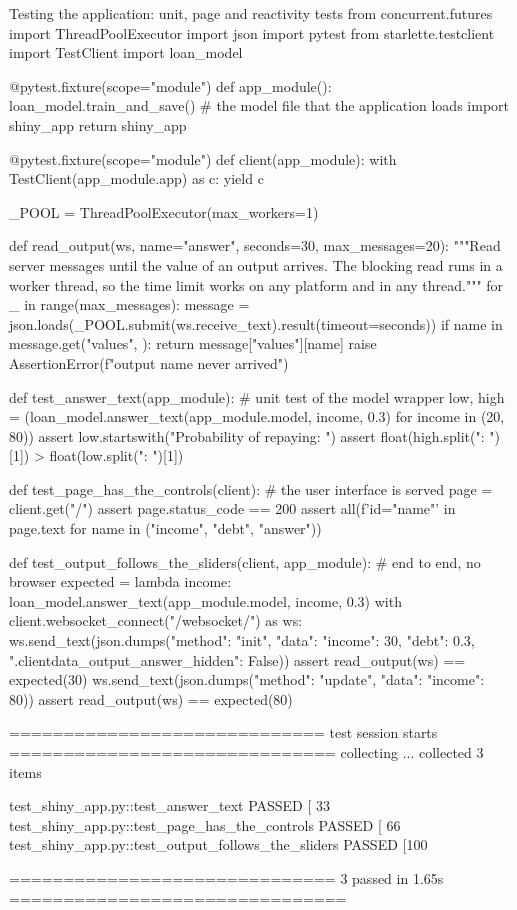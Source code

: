 \begin{pylisting}[label={lst:shinytest}]{Testing the application: unit, page and reactivity tests}
from concurrent.futures import ThreadPoolExecutor
import json
import pytest
from starlette.testclient import TestClient
import loan_model

@pytest.fixture(scope="module")
def app_module():
    loan_model.train_and_save()            # the model file that the application loads
    import shiny_app
    return shiny_app

@pytest.fixture(scope="module")
def client(app_module):
    with TestClient(app_module.app) as c:
        yield c

_POOL = ThreadPoolExecutor(max_workers=1)

def read_output(ws, name="answer", seconds=30, max_messages=20):
    """Read server messages until the value of an output arrives. The blocking read runs
    in a worker thread, so the time limit works on any platform and in any thread."""
    for _ in range(max_messages):
        message = json.loads(_POOL.submit(ws.receive_text).result(timeout=seconds))
        if name in message.get("values", {}):
            return message["values"][name]
    raise AssertionError(f"output {name} never arrived")


def test_answer_text(app_module):                    # unit test of the model wrapper
    low, high = (loan_model.answer_text(app_module.model, income, 0.3)
                 for income in (20, 80))
    assert low.startswith("Probability of repaying: ")
    assert float(high.split(": ")[1]) > float(low.split(": ")[1])

def test_page_has_the_controls(client):              # the user interface is served
    page = client.get("/")
    assert page.status_code == 200
    assert all(f'id="{name}"' in page.text for name in ("income", "debt", "answer"))

def test_output_follows_the_sliders(client, app_module):   # end to end, no browser
    expected = lambda income: loan_model.answer_text(app_module.model, income, 0.3)
    with client.websocket_connect("/websocket/") as ws:
        ws.send_text(json.dumps({"method": "init", "data": {
            "income": 30, "debt": 0.3, ".clientdata_output_answer_hidden": False}}))
        assert read_output(ws) == expected(30)
        ws.send_text(json.dumps({"method": "update", "data": {"income": 80}}))
        assert read_output(ws) == expected(80)
\end{pylisting}
\begin{pyoutput}
============================= test session starts ==============================
collecting ... collected 3 items

test_shiny_app.py::test_answer_text PASSED                               [ 33%
test_shiny_app.py::test_page_has_the_controls PASSED                     [ 66%
test_shiny_app.py::test_output_follows_the_sliders PASSED                [100%

============================== 3 passed in 1.65s ===============================
\end{pyoutput}

